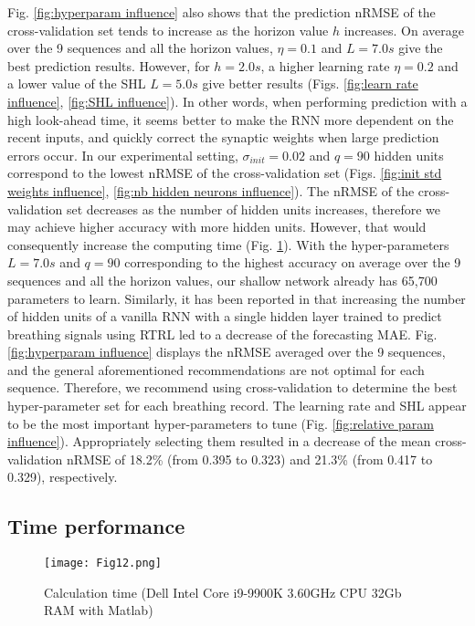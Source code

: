 \documentclass[twocolumn,a4paper]{svjour3} \sloppy          \smartqed
\begin{document}
Fig. \ref{fig:hyperparam influence} also shows that the prediction nRMSE of the cross-validation set tends to increase as the horizon value $h$ increases. On average over the 9 sequences and all the horizon values, $\eta = 0.1$ and $L = 7.0s$ give the best prediction results. However, for $h=2.0s$, a higher learning rate $\eta = 0.2$ and a lower value of the SHL $L= 5.0s$ give better results (Figs. \ref{fig:learn rate influence}, \ref{fig:SHL influence}). In other words, when performing prediction with a high look-ahead time, it seems better to make the RNN more dependent on the recent inputs, and quickly correct the synaptic weights when large prediction errors occur. In our experimental setting, $\sigma_{init} = 0.02$ and $q=90$ hidden units correspond to the lowest nRMSE of the cross-validation set (Figs. \ref{fig:init std weights influence}, \ref{fig:nb hidden neurons influence}). The nRMSE of the cross-validation set decreases as the number of hidden units increases, therefore we may achieve higher accuracy with more hidden units. However, that would consequently increase the computing time (Fig. \ref{fig:prediction time}). With the hyper-parameters $L = 7.0s$ and $q = 90$ corresponding to the highest accuracy on average over the 9 sequences and all the horizon values, our shallow network already has 65,700 parameters to learn. Similarly, it has been reported in \cite{POHL2021101941} that increasing the number of hidden units of a vanilla RNN with a single hidden layer trained to predict breathing signals using RTRL led to a decrease of the forecasting MAE. Fig. \ref{fig:hyperparam influence} displays the nRMSE averaged over the 9 sequences, and the general aforementioned recommendations are not optimal for each sequence. Therefore, we recommend using cross-validation to determine the best hyper-parameter set for each breathing record. The learning rate and SHL appear to be the most important hyper-parameters to tune (Fig. \ref{fig:relative param influence}). Appropriately selecting them resulted in a decrease of the mean cross-validation nRMSE of 18.2\% (from 0.395 to 0.323) and 21.3\% (from 0.417 to 0.329), respectively.


\subsection{Time performance}

\begin{figure}[htb!]
\centering
\texttt{[image: Fig12.png]}
\caption{Calculation time (Dell Intel Core i9-9900K 3.60GHz CPU 32Gb RAM with Matlab)} 
\label{fig:prediction time}
\end{figure}
\end{document}
